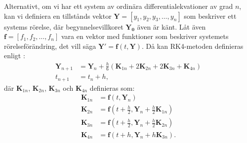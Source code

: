 Alternativt, om vi har ett system av ordinära differentialekvationer av grad $n$, kan vi definiera en tillstånds vektor $\mathbf{Y} = [y_1, y_2, y_3, \ldots, y_n]$ som beskriver ett systems rörelse, där begynnelsevillkoret $\mathbf{Y_0}$ även är känt. Låt även $\mathbf{f} = [f_1, f_2, \ldots, f_n]$ vara en vektor med funktioner som beskriver systemets rörelseförändring, det vill säga $\mathbf{Y}' = \mathbf{f}(t,\mathbf{Y})$. Då kan RK4-metoden definieras enligt \cite{runge_kutta_methods_2026}:
\begin{align}
    \mathbf{Y}_{n+1} &= \mathbf{Y}_n + \frac{h}{6}\left(\mathbf{K}_{1n} + 2\mathbf{K}_{2n} + 2\mathbf{K}_{3n} + \mathbf{K}_{4n}\right) \\
    t_{n+1} &= t_n + h,
\end{align}
där $\mathbf{K}_{1n}$, $\mathbf{K}_{2n}$, $\mathbf{K}_{3n}$ och $\mathbf{K}_{4n}$ definieras som:
\begin{align}
    \mathbf{K}_{1n} &= \mathbf{f}(t,\mathbf{Y}_n) \\
    \mathbf{K}_{2n} &= \mathbf{f}\left(t + \frac{h}{2}, \mathbf{Y}_n + \frac{h}{2}\mathbf{K}_{1n}\right) \\
    \mathbf{K}_{3n} &= \mathbf{f}\left(t + \frac{h}{2}, \mathbf{Y}_n + \frac{h}{2}\mathbf{K}_{2n}\right) \\
    \mathbf{K}_{4n} &= \mathbf{f}\left(t + h, \mathbf{Y}_n + h\mathbf{K}_{3n}\right).
\end{align}



